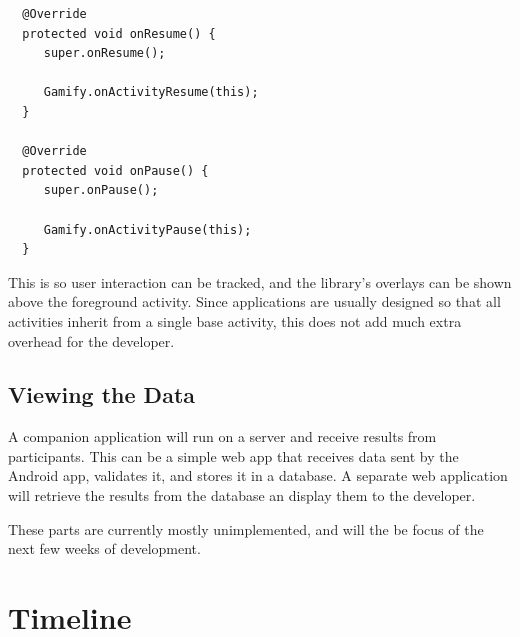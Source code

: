\begin{verbatim}
  @Override
  protected void onResume() {
     super.onResume();

     Gamify.onActivityResume(this);
  }
  
  @Override
  protected void onPause() {
     super.onPause();

     Gamify.onActivityPause(this);
  }
\end{verbatim}

This is so user interaction can be tracked, and the library's overlays can be shown above the foreground activity. Since applications are usually designed so that all activities inherit from a single base activity, this does not add much extra overhead for the developer.

\section{Viewing the Data}

A companion application will run on a server and receive results from participants. This can be a simple web app that receives data sent by the Android app, validates it, and stores it in a database. A separate web application will retrieve the results from the database an display them to the developer.

These parts are currently mostly unimplemented, and will the be focus of the next few weeks of development.

\chapter{Timeline}


